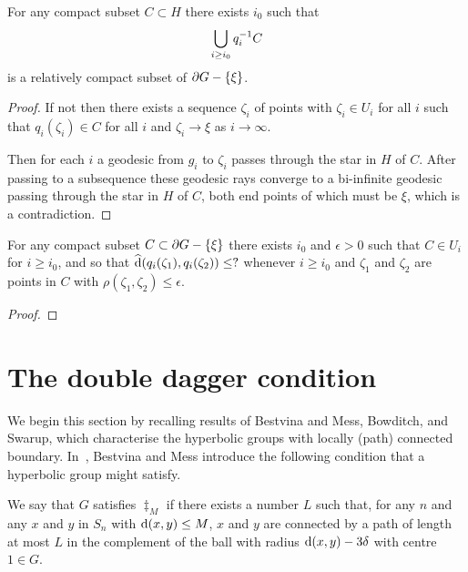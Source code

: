 \documentclass[a4paper]{article}
\begin{document}
\begin{lemma}\label{lem:propermaps} 
  For any compact subset $C \subset H$ there exists $i_0$ such that
  \begin{equation*}
    \bigcup_{i\geq i_0} q_i^{-1} C
  \end{equation*}
  is a relatively compact subset of $\partial G - \left\{\xi\right\}$.
\end{lemma}

\begin{proof}
  If not then there exists a sequence $\zeta_i$ of points with $\zeta_i \in U_i$ 
  for all $i$ such that $q_i(\zeta_i) \in C$ for all $i$ and $\zeta_i \to \xi$ 
  as $i \to \infty$.

  Then for each $i$ a geodesic from $g_i$ to $\zeta_i$ passes through the star 
  in $H$ of $C$.  After passing to a subsequence these geodesic rays converge to 
  a bi-infinite geodesic passing through the star in $H$ of $C$, both end points 
  of which must be $\xi$, which is a contradiction.
\end{proof}

\begin{lemma}\label{lem:uniform_continuity}
  For any compact subset $C \subset \partial G - \left\{\xi\right\}$ there exists $i_0$
  and $\epsilon > 0$ such that $C \in U_i$ for $i \geq i_0$, and so that
  $\operatorname{\widehat{d}}(q_i(\zeta_1), q_i(\zeta_2)) \leq ?$ whenever $i \geq i_0$ and
  $\zeta_1$ and $\zeta_2$ are points in $C$ with $\rho(\zeta_1, \zeta_2) \leq
  \epsilon$.
\end{lemma}

\begin{proof}
\end{proof}

\section{The double dagger condition}

We begin this section by recalling results of Bestvina and Mess, Bowditch, and
Swarup, which characterise the hyperbolic groups with locally (path) connected
boundary. In~\cite{bestvinamess91}, Bestvina and Mess introduce the following
condition that a hyperbolic group might satisfy.

\begin{definition}
  We say that $G$ satisfies $\ddag_M$ if there exists a number $L$ such that,
  for any $n$ and any $x$ and $y$ in $S_n$ with $\operatorname{d}(x,y) \leq M$, $x$ and
  $y$ are connected by a path of length at most $L$ in the complement of the
  ball with radius $\operatorname{d}(x,y) - 3\delta$ with centre $1 \in G$.
\end{definition}
\end{document}
